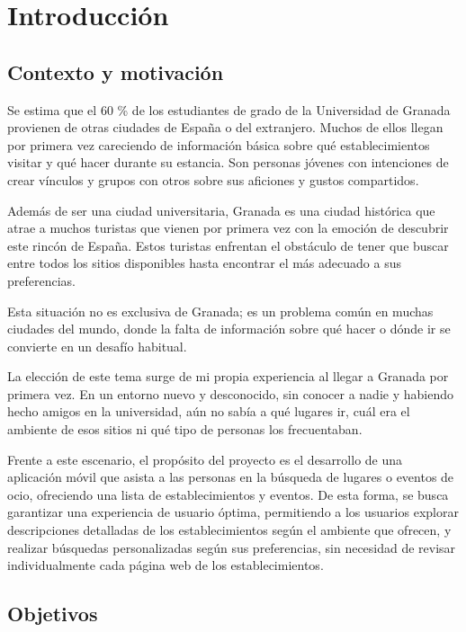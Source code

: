 \chapter{Introducción}
    \section{Contexto y motivación}

        Se estima que el 60 \% de los estudiantes de grado de la Universidad de Granada provienen de otras ciudades de
        España o del extranjero. Muchos de ellos llegan por primera vez careciendo de información básica sobre qué
        establecimientos visitar y qué hacer durante su estancia. Son personas jóvenes con intenciones de crear vínculos
        y grupos con otros sobre sus aficiones y gustos compartidos.

        Además de ser una ciudad universitaria, Granada es una ciudad histórica que atrae a muchos turistas que vienen
        por primera vez con la emoción de descubrir este rincón de España. Estos turistas enfrentan el obstáculo de
        tener que buscar entre todos los sitios disponibles hasta encontrar el más adecuado a sus preferencias.

        Esta situación no es exclusiva de Granada; es un problema común en muchas ciudades del mundo, donde la falta de
        información sobre qué hacer o dónde ir se convierte en un desafío habitual.

        La elección de este tema surge de mi propia experiencia al llegar a Granada por primera vez. En un entorno nuevo
        y desconocido, sin conocer a nadie y habiendo hecho amigos en la universidad, aún no sabía a qué lugares ir,
        cuál era el ambiente de esos sitios ni qué tipo de personas los frecuentaban. 

        Frente a este escenario, el propósito del proyecto es el desarrollo de una aplicación móvil que asista a las
        personas en la búsqueda de lugares o eventos de ocio, ofreciendo una lista de establecimientos y eventos. De
        esta forma, se busca garantizar una experiencia de usuario óptima, permitiendo a los usuarios explorar
        descripciones detalladas de los establecimientos según el ambiente que ofrecen, y realizar búsquedas
        personalizadas según sus preferencias, sin necesidad de revisar individualmente cada página web de los
        establecimientos.

        
    \section{Objetivos}

